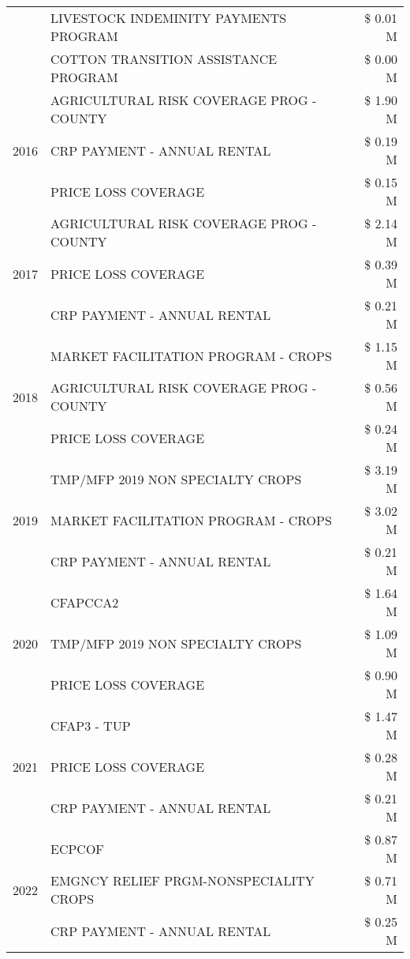 \begin{tabular}{llr}
 & LIVESTOCK INDEMINITY PAYMENTS PROGRAM & \$ 0.01 M \\
 & COTTON TRANSITION ASSISTANCE PROGRAM & \$ 0.00 M \\
\cline{1-3}
\multirow[t]{3}{*}{2016} & AGRICULTURAL RISK COVERAGE PROG - COUNTY & \$ 1.90 M \\
 & CRP PAYMENT - ANNUAL RENTAL & \$ 0.19 M \\
 & PRICE LOSS COVERAGE & \$ 0.15 M \\
\cline{1-3}
\multirow[t]{3}{*}{2017} & AGRICULTURAL RISK COVERAGE PROG - COUNTY & \$ 2.14 M \\
 & PRICE LOSS COVERAGE & \$ 0.39 M \\
 & CRP PAYMENT - ANNUAL RENTAL & \$ 0.21 M \\
\cline{1-3}
\multirow[t]{3}{*}{2018} & MARKET FACILITATION PROGRAM - CROPS & \$ 1.15 M \\
 & AGRICULTURAL RISK COVERAGE PROG - COUNTY & \$ 0.56 M \\
 & PRICE LOSS COVERAGE & \$ 0.24 M \\
\cline{1-3}
\multirow[t]{3}{*}{2019} & TMP/MFP 2019 NON SPECIALTY CROPS & \$ 3.19 M \\
 & MARKET FACILITATION PROGRAM - CROPS & \$ 3.02 M \\
 & CRP PAYMENT - ANNUAL RENTAL & \$ 0.21 M \\
\cline{1-3}
\multirow[t]{3}{*}{2020} & CFAPCCA2 & \$ 1.64 M \\
 & TMP/MFP 2019 NON SPECIALTY CROPS & \$ 1.09 M \\
 & PRICE LOSS COVERAGE & \$ 0.90 M \\
\cline{1-3}
\multirow[t]{3}{*}{2021} & CFAP3 - TUP & \$ 1.47 M \\
 & PRICE LOSS COVERAGE & \$ 0.28 M \\
 & CRP PAYMENT - ANNUAL RENTAL & \$ 0.21 M \\
\cline{1-3}
\multirow[t]{3}{*}{2022} & ECPCOF & \$ 0.87 M \\
 & EMGNCY RELIEF PRGM-NONSPECIALITY CROPS & \$ 0.71 M \\
 & CRP PAYMENT - ANNUAL RENTAL & \$ 0.25 M \\
\cline{1-3}
\bottomrule
\end{tabular}
